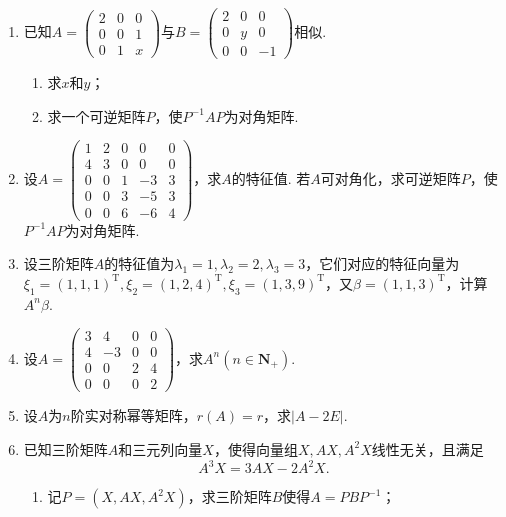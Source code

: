 \begin{enumerate}
    \item 已知$A=\begin{pmatrix}
                  2 & 0 & 0 \\ 0 & 0 & 1 \\ 0 & 1 & x
              \end{pmatrix}$与$B=\begin{pmatrix}
                  2 & 0 & 0 \\ 0 & y & 0 \\ 0 & 0 & -1
              \end{pmatrix}$相似.
          \begin{enumerate}
              \item 求$x$和$y$；

              \item 求一个可逆矩阵$P$，使$P^{-1}AP$为对角矩阵.
          \end{enumerate}

    \item 设$A=\begin{pmatrix}
                  1 & 2 & 0 & 0  & 0 \\ 4 & 3 & 0 & 0 & 0 \\ 0 & 0 & 1 & -3 & 3 \\ 0 & 0 & 3 & -5 & 3 \\
                  0 & 0 & 6 & -6 & 4
              \end{pmatrix}$，求$A$的特征值. 若$A$可对角化，求可逆矩阵$P$，使$P^{-1}AP$为对角矩阵.

    \item 设三阶矩阵$A$的特征值为$\lambda_1=1,\lambda_2=2,\lambda_3=3$，它们对应的特征向量为$\xi_1=(1,1,1)^\mathrm{T}, \xi_2=(1,2,4)^\mathrm{T},\xi_3=(1,3,9)^\mathrm{T}$，又$\beta=(1,1,3)^\mathrm{T}$，计算$A^n\beta$.

    \item 设$A=\begin{pmatrix}
                  3 & 4 & 0 & 0 \\ 4 & -3 & 0 & 0 \\ 0 & 0 & 2 & 4 \\ 0 & 0 & 0 & 2
              \end{pmatrix}$，求$A^n(n\in\mathbf{N}_+)$.

    \item 设$A$为$n$阶实对称幂等矩阵，$r(A)=r$，求$|A-2E|$.

    \item 已知三阶矩阵$A$和三元列向量$X$，使得向量组$X,AX,A^2X$线性无关，且满足
          \[A^3X=3AX-2A^2X.\]
          \begin{enumerate}
              \item 记$P=(X,AX,A^2X)$，求三阶矩阵$B$使得$A=PBP^{-1}$；


\end{enumerate}
\end{enumerate}
